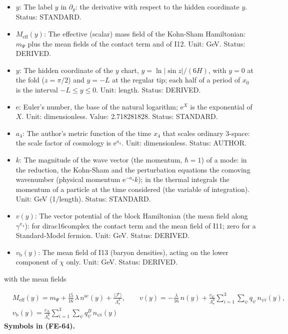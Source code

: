 \documentclass[
  10pt,
]{article}
\begin{document}
\begin{itemize}
\item
  \(y\): The label \(y\) in \(\partial_y\): the derivative with respect
  to the hidden coordinate \(y\). Status: STANDARD.
\item
  \(M_{\mathrm{eff}}(y)\): The effective (scalar) mass field of the
  Kohn-Sham Hamiltonian: \(m_\Psi\) plus the mean fields of the contact
  term and of I12. Unit: GeV. Status: DERIVED.
\item
  \(y\): The hidden coordinate of the \(y\) chart,
  \(y = \ln\lvert\sin z\rvert/(6H)\), with \(y = 0\) at the fold
  (\(z = \pi/2\)) and \(y = -L\) at the regular tip; each half of a
  period of \(x_0\) is the interval \(-L \le y \le 0\). Unit: length.
  Status: DERIVED.
\item
  \(\mathrm{e}\): Euler's number, the base of the natural logarithm;
  \(\mathrm{e}^{X}\) is the exponential of \(X\). Unit: dimensionless.
  Value: 2.718281828. Status: STANDARD.
\item
  \(a_4\): The author's metric function of the time \(x_4\) that scales
  ordinary 3-space: the scale factor of cosmology is
  \(\mathrm{e}^{a_4}\). Unit: dimensionless. Status: AUTHOR.
\item
  \(k\): The magnitude of the wave vector (the momentum, \(\hbar = 1\))
  of a mode: in the reduction, the Kohn-Sham and the perturbation
  equations the comoving wavenumber (physical momentum
  \(\mathrm{e}^{-a_4}k\)); in the thermal integrals the momentum of a
  particle at the time considered (the variable of integration). Unit:
  GeV (1/length). Status: STANDARD.
\item
  \(v(y)\): The vector potential of the block Hamiltonian (the mean
  field along \(\gamma^{x_4}\)): for dirac16complex the contact term and
  the mean field of I11; zero for a Standard-Model fermion. Unit: GeV.
  Status: DERIVED.
\item
  \(v_{\mathrm{b}}(y)\): The mean field of I13 (baryon densities),
  acting on the lower component of \(\chi\) only. Unit: GeV. Status:
  DERIVED.
\end{itemize}

with the mean fields

\[
\begin{aligned}
&M_{\mathrm{eff}}(y) = m_\Psi + \frac{15}{16}\,\lambda\,n^{\mathrm{sc}}(y) +
 \frac{\langle\mathcal{F}\rangle}{\Lambda_\star^3},\qquad
 v(y) = -\frac{\lambda}{16}\,n(y) + \frac{c_{\mathrm{V}}}{\Lambda_\star^6}\sum_{i=1}^{3}\sum_\psi
 q_\psi\,n_{\psi i}(y),\\
&v_{\mathrm{b}}(y) = \frac{c_{\mathrm{A}}}{\Lambda_\star^6}\sum_{i=1}^{3}\sum_\psi q^{B}_\psi\,n_{\psi i}(y)
\end{aligned} \tag{FE-64}
\] \textbf{Symbols in (FE-64).}
\end{document}
